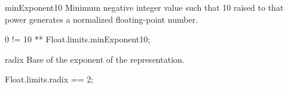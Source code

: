 \begin{urbiscriptapi}
\item[minExponent10]
  Minimum negative integer value such that 10 raised to that power
  generates a normalized floating-point number.
\begin{urbiassert}
0 != 10 ** Float.limits.minExponent10;
\end{urbiassert}

\item[radix]
  Base of the exponent of the representation.
\begin{urbiassert}
Float.limits.radix == 2;
\end{urbiassert}
\end{urbiscriptapi}

